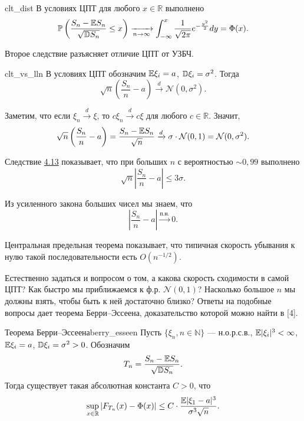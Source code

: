\begin{corollary}{}{clt_dist}
    В условиях ЦПТ для любого $x \in \mathbb{R}$ выполнено
    $$ \mathbb{P} \left( \frac{S_n - \mathbb{E} S_n}{\sqrt{\mathbb{D} S_n}} \le x \right) \xrightarrow[n \to \infty]{} \int_{-\infty}^{x} \frac{1}{\sqrt{2\pi}} e^{-\frac{y^2}{2}} dy = \Phi(x). $$
\end{corollary}

Второе следствие разъясняет отличие ЦПТ от УЗБЧ.

\begin{corollary}{}{clt_vs_lln}
    В условиях ЦПТ обозначим $\mathbb{E} \xi_i = a$, $\mathbb{D} \xi_i = \sigma^2$. Тогда
    $$ \sqrt{n} \left( \frac{S_n}{n} - a \right) \xrightarrow{d} \mathcal{N}(0, \sigma^2). $$
\end{corollary}

\begin{proofbox}
    Заметим, что если $\xi_n \xrightarrow{d} \xi$, то $c \xi_n \xrightarrow{d} c \xi$ для любого $c \in \mathbb{R}$. Значит,
    $$ \sqrt{n} \left( \frac{S_n}{n} - a \right) = \frac{S_n - \mathbb{E} S_n}{\sqrt{n}} \xrightarrow{d} \sigma \cdot \mathcal{N}(0, 1) = \mathcal{N}(0, \sigma^2). $$
\end{proofbox}

Следствие \hyperref[cor:clt_vs_lln]{4.13} показывает, что при больших $n$ с вероятностью $\sim 0,99$ выполнено
$$ \sqrt{n} \left| \frac{S_n}{n} - a \right| \le 3\sigma. $$

Из усиленного закона больших чисел мы знаем, что
$$ \left| \frac{S_n}{n} - a \right| \xrightarrow{\text{п.н.}} 0. $$

Центральная предельная теорема показывает, что типичная скорость убывания к нулю такой последовательности есть $O(n^{-1/2})$.

\vspace{1.5em}
Естественно задаться и вопросом о том, а какова скорость сходимости в самой ЦПТ? Как быстро мы приближаемся к ф.р. $\mathcal{N}(0, 1)$? Насколько большое $n$ мы должны взять, чтобы быть к ней достаточно близко? Ответы на подобные вопросы дает теорема Берри--Эссеена, доказательство которой можно найти в [4].

\begin{theorem}{Теорема Берри--Эссеена}{berry_esseen}
    Пусть $\{\xi_n, n \in \mathbb{N}\}$ --- н.о.р.с.в., $\mathbb{E} |\xi_i|^3 < \infty$, $\mathbb{E} \xi_i = a$, $\mathbb{D} \xi_i = \sigma^2 > 0$. Обозначим
    $$ T_n = \frac{S_n - \mathbb{E} S_n}{\sqrt{\mathbb{D} S_n}}. $$
    Тогда существует такая абсолютная константа $C > 0$, что
    $$ \sup_{x \in \mathbb{R}} |F_{T_n}(x) - \Phi(x)| \le C \cdot \frac{\mathbb{E} |\xi_1 - a|^3}{\sigma^3 \sqrt{n}}. $$
\end{theorem}

